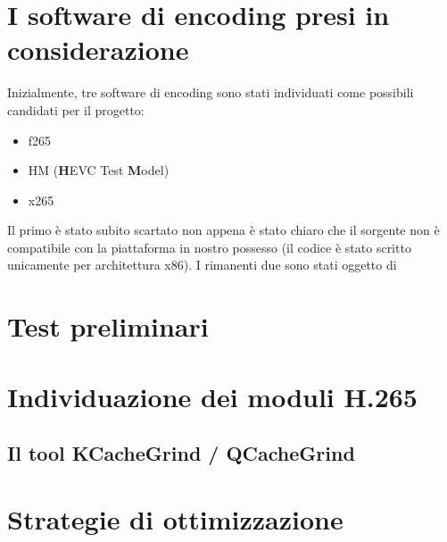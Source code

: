 \section{I software di encoding presi in considerazione}
Inizialmente, tre software di encoding sono stati individuati come possibili
candidati per il progetto:
\begin{itemize}
\item f265
\item HM (\textbf{H}EVC Test \textbf{M}odel)
\item x265
\end{itemize}
Il primo è stato subito scartato non appena è stato chiaro che il sorgente non 
è compatibile con la piattaforma in nostro possesso (il codice è stato scritto 
unicamente per architettura x86).
I rimanenti due sono stati oggetto di 

\section{Test preliminari}


\section{Individuazione dei moduli H.265}


\subsection{Il tool KCacheGrind / QCacheGrind}


\section{Strategie di ottimizzazione}



